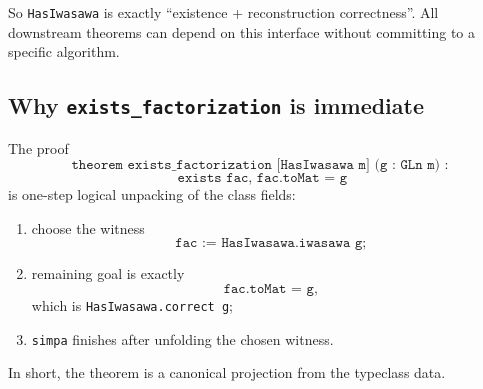 \documentclass[11pt]{article}
\begin{document}
So \texttt{HasIwasawa} is exactly ``existence + reconstruction correctness''.
All downstream theorems can depend on this interface without committing to a specific algorithm.

\subsection*{Why \texttt{exists\_factorization} is immediate}
The proof
\[
\texttt{theorem exists\_factorization [HasIwasawa m] (g : GLn m) :}
\]
\[
\texttt{  exists fac, fac.toMat = g}
\]
is one-step logical unpacking of the class fields:
\begin{enumerate}[leftmargin=1.5em]
\item choose the witness
\[
\texttt{fac := HasIwasawa.iwasawa g};
\]
\item remaining goal is exactly
\[
\texttt{fac.toMat = g},
\]
which is \texttt{HasIwasawa.correct g};
\item \texttt{simpa} finishes after unfolding the chosen witness.
\end{enumerate}
In short, the theorem is a canonical projection from the typeclass data.
\end{document}
